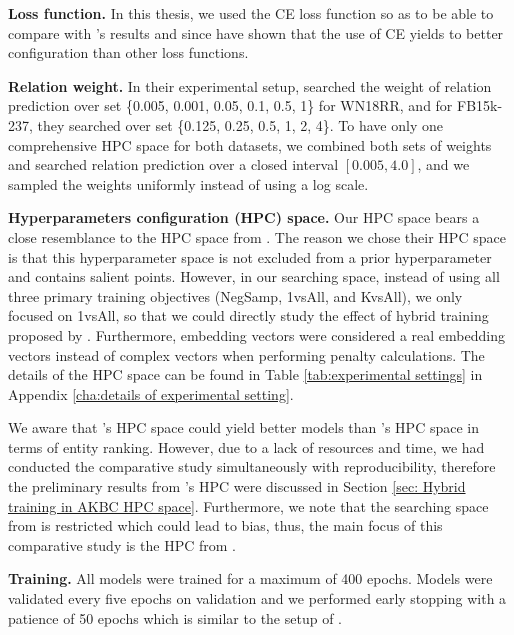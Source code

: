 \noindent\textbf{Loss function.} In this thesis, we used the CE loss function so as to be able to compare with \citet{chen2021relation}'s results and since \citet{Ruffinelli2020You} have shown that the use of CE yields to better configuration than other loss functions. 
\newline

\noindent\textbf{Relation weight.} In their experimental setup, \citet{chen2021relation} searched the weight of relation prediction over set \{0.005, 0.001, 0.05, 0.1, 0.5, 1\} for WN18RR, and for FB15k-237, they searched over set \{0.125, 0.25, 0.5, 1, 2, 4\}. To have only one comprehensive HPC space for both datasets, we combined both sets of weights and searched relation prediction over a closed interval $[0.005, 4.0]$, and we sampled the weights uniformly instead of using a log scale. 
\newline

\noindent\textbf{Hyperparameters configuration (HPC) space.} Our HPC space bears a close resemblance to the HPC space from \citet{Ruffinelli2020You}. The reason we chose their HPC space is that this hyperparameter space is not excluded from a prior hyperparameter and contains salient points. However, in our searching space, instead of using all three primary training objectives (NegSamp, 1vsAll, and KvsAll), we only focused on 1vsAll, so that we could directly study the effect of hybrid training proposed by \citet{chen2021relation}. Furthermore, embedding vectors were considered a real embedding vectors instead of complex vectors when performing penalty calculations. The details of the HPC space can be found in Table \ref{tab:experimental settings} in Appendix \ref{cha:details of experimental setting}.

We aware that \citet{chen2021relation}'s HPC space could yield better models than \citet{Ruffinelli2020You}'s HPC space in terms of entity ranking. However, due to a lack of resources and time, we had conducted the comparative study simultaneously with reproducibility, therefore the preliminary results from \cite{chen2021relation}'s HPC were discussed in Section \ref{sec: Hybrid training in AKBC HPC space}. Furthermore, we note that the searching space from \cite{chen2021relation} is restricted which could lead to bias, thus, the main focus of this comparative study is the HPC from \cite{Ruffinelli2020You}.
\newline


\noindent\textbf{Training.} All models were trained for a maximum of 400 epochs. Models were validated every five epochs on validation and we performed early stopping with a patience of 50 epochs which is similar to the setup of \citet{Ruffinelli2020You}.
\newline

